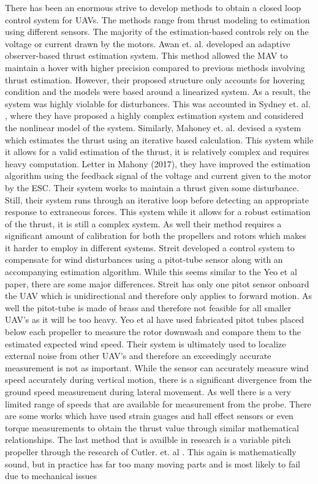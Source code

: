 \documentclass[conference]{IEEEtran}
\begin{document}
There has been an enormous strive to develop methods to obtain a closed loop control system for UAVs. The methods range from thrust modeling to estimation using different sensors. The majority of the estimation-based controls rely on the voltage or current drawn by the motors.
Awan et. al. \cite{awan} developed an adaptive observer-based thrust estimation system. This method allowed the MAV to maintain a hover with higher precision compared to previous methods involving thrust estimation. However, their proposed structure only accounts for hovering condition and the models were based around a linearized system. As a result, the system was highly violable for disturbances. This was accounted in Sydney et. al. \cite{sydney}, where they have proposed a highly complex estimation system and considered the nonlinear model of the system. Similarly, Mahoney et. al. \cite{mahoney1} devised a system which estimates the thrust using an iterative based calculation. This system while it allows for a valid estimation of the thrust, it is relatively complex and requires heavy computation. Letter in Mahony (2017), they have improved the estimation algorithm using the feedback signal of the voltage and current given to the motor by the ESC. Their system works to maintain a thrust given some disturbance. Still, their system runs through an iterative loop before detecting an appropriate response to extraneous forces. This system while it allows for a robust estimation of the thrust, it is still a complex system. As well their method requires a significant amount of calibration for both the propellers and rotors which makes it harder to employ in different systems. Streit \cite{streit} developed a control system to compensate for wind disturbances using a pitot-tube sensor along with an accompanying estimation algorithm. While this seems similar to the Yeo et al paper, there are some major differences. Streit \cite{streit} has only one pitot sensor onboard the UAV which is unidirectional and therefore only applies to forward motion. As well the pitot-tube is made of brass and therefore not feasible for all smaller UAV’s as it will be too heavy. Yeo et al have used fabricated pitot tubes placed below each propeller to measure the rotor downwash and compare them to the estimated expected wind speed. Their system is ultimately used to localize external noise from other UAV’s and therefore an exceedingly accurate measurement is not as important. While the sensor can accurately measure wind speed accurately during vertical motion, there is a significant divergence from the ground speed measurement during lateral movement. As well there is a very limited range of speeds that are available for measurement from the probe. There are some works which have used strain guages and hall effect sensors or even torque measurements to obtain the thrust value through similar mathematical relationships. The last method that is availble in research is a variable pitch propeller through the research of Cutler. et. al \cite{cutler}. This again is mathematically sound, but in practice has far too many moving parts and is most likely to fail due to mechanical issues
\end{document}
